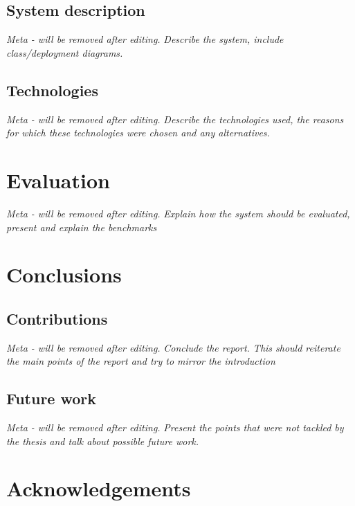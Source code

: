 \documentclass[11pt,a4paper]{globis-book}
\begin{document}
\section{System description}
\textit{Meta - will be removed after editing.}
\textit{Describe the system, include class/deployment diagrams.}

\section{Technologies}
\textit{Meta - will be removed after editing.}
\textit{Describe the technologies used, the reasons for which these technologies were chosen and any alternatives.}

\chapter{Evaluation}
\label{ch:evaluation}

\textit{Meta - will be removed after editing.}
\textit{Explain how the system should be evaluated, present and explain the benchmarks}

\chapter{Conclusions}
\label{ch:conclusions}

\section{Contributions}
\label{sec:conclusions-contribution}
\textit{Meta - will be removed after editing.}
\textit{Conclude the report. This should reiterate the main points of the report and try to mirror the introduction}

\section{Future work}
\label{sec:conclusions-future-work}
\textit{Meta - will be removed after editing.}
\textit{Present the points that were not tackled by the thesis and talk about possible future work.}

\appendix

\listoffigures
\listoftables

\chapter*{Acknowledgements}

\newpage
\thispagestyle{empty}



\end{document}
